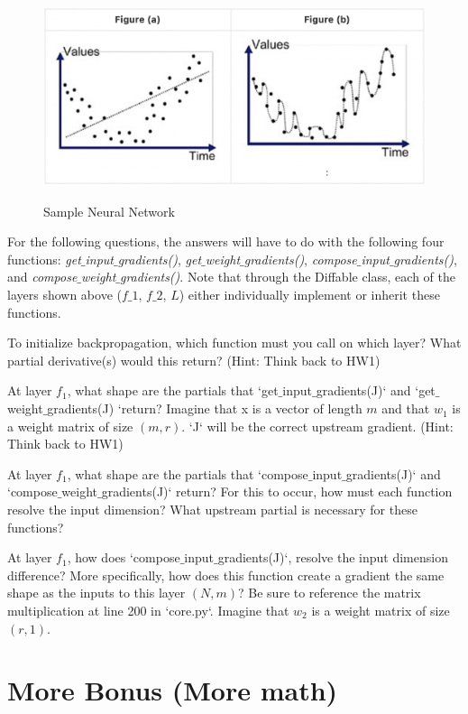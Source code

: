 \documentclass[11pt, answers]{exam}
\begin{document}
\begin{figure}[H]
	\caption{Sample Neural Network}
	\centering
	\includegraphics[width=0.7\linewidth]{./images/hw2-fit.png}
	\label{fig:label}
\end{figure}

For the following questions, the answers will have to do with the following four functions: \textit{get$\_$input$\_$gradients()}, \textit{get$\_$weight$\_$gradients()}, \textit{compose$\_$input$\_$gradients()}, and \textit{compose$\_$weight$\_$gradients()}. Note that through the Diffable class, each of the layers shown above ($f\_1$, $f\_2$, $L$)  either individually  implement or inherit these functions.

\begin{questions}
	\question
	To initialize backpropagation, which function must you call on which layer? What partial derivative(s) would this return? (Hint: Think back to HW1)

	\question
	At layer $f_1$, what shape are the partials that `get$\_$input$\_$gradients(J)` and `get$\_$weight$\_$gradients(J) `return? Imagine that x is a vector of length $m$ and that $w_1$ is a weight matrix of size $(m, r)$. `J` will be the correct upstream gradient. (Hint: Think back to HW1)

	\question
	At layer $f_1$, what shape are the partials that `compose$\_$input$\_$gradients(J)` and `compose$\_$weight$\_$gradients(J)` return? For this to occur, how must each function resolve the input dimension? What upstream partial is necessary for these functions?

	\question
	At layer $f_1$, how does `compose$\_$input$\_$gradients(J)`,  resolve the input dimension difference? More specifically, how does this function create a gradient the same shape as the inputs to this layer $(N,m)$? Be sure to reference the matrix multiplication at line 200 in `core.py`. Imagine that $w_2$ is a weight matrix of size $(r,1)$.

\end{questions}

\section*{More Bonus (More math)}
\end{document}
